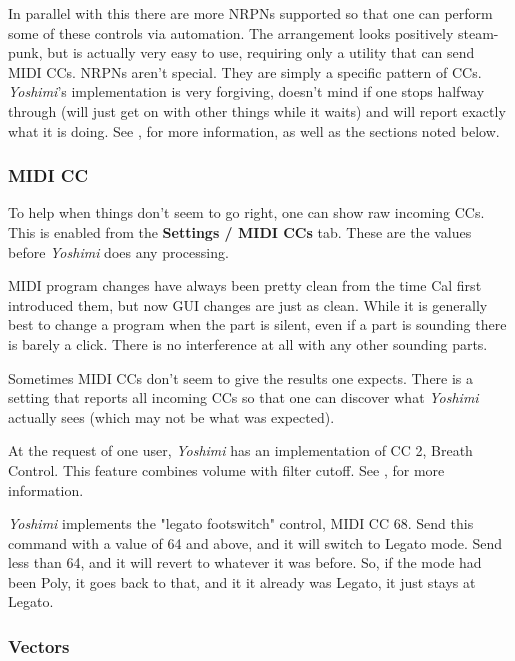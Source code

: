 \documentclass[
 11pt,
 twoside,
 a4paper,
 final                                 %
]{article}
\begin{document}
   In parallel with this there are more NRPNs supported so that one can perform
   some of these controls via automation. The arrangement looks positively
   steam-punk, but is actually very easy to use, requiring only a utility that
   can send MIDI CCs.  NRPNs aren't special. They are simply a specific pattern
   of CCs.  \textsl{Yoshimi}'s implementation is very forgiving, doesn't mind
   if one stops halfway through (will just get on with other things while it
   waits) and will report exactly what it is doing.
   See , for more information, as well as the sections
   noted below.

\subsubsection{MIDI CC}
\label{subsubsec:new_features_midi_cc}

   To help when things don't seem to go right, one can show raw incoming
   CCs. This is enabled from the \textbf{Settings / MIDI CCs} tab.
   These are the values before \textsl{Yoshimi} does any processing.

   MIDI program changes have always been pretty clean from the time Cal first
   introduced them, but now GUI changes are just as clean. While it is
   generally best to change a program when the part is silent, even if a part
   is sounding there is barely a click. There is no interference at all
   with any other sounding parts.

   Sometimes MIDI CCs don't seem to give the results one expects. There is
   a setting that reports all incoming CCs so that one can discover
   what \textsl{Yoshimi} actually sees (which may not be what was expected).

   At the request of one user, \textsl{Yoshimi} has an implementation of CC 2,
   Breath Control. This feature combines volume with filter cutoff.
   See , for more information.

   \textsl{Yoshimi} implements the "legato footswitch" control,
   MIDI CC 68.
   Send this command with a value of 64 and above, and it will
   switch to Legato mode. Send less than 64, and it will revert to whatever it
   was before.  So, if the mode had been Poly, it goes back to that, and it it
   already was Legato, it just stays at Legato.

\subsubsection{Vectors}
\label{subsubsec:new_features_vectors}
\end{document}
